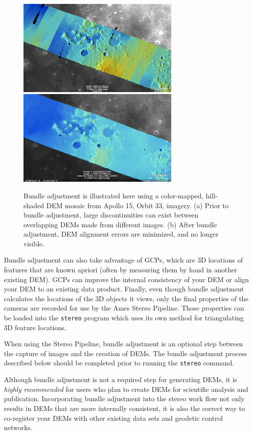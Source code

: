 \begin{figure}[bt]
  \centering
  \includegraphics[width=8cm]{images/ba_orig}
  \includegraphics[width=8cm]{images/ba_adjusted}
  \caption{Bundle adjustment is illustrated here using a color-mapped,
    hill-shaded DEM mosaic from Apollo 15, Orbit 33, imagery. (a)
    Prior to bundle adjustment, large discontinuities can exist between
    overlapping DEMs made from different images. (b) After bundle
    adjustment, DEM alignment errors are minimized, and no longer visible.}
  \label{fig:bundle_adjustment}
\end{figure}

Bundle adjustment can also take advantage of \acp{GCP}, which are
3D locations of features that are known apriori (often by measuring
them by hand in another existing \ac{DEM}). \acp{GCP} can improve the internal
consistency of your \ac{DEM} or align your \ac{DEM} to an existing data
product. Finally, even though bundle adjustment calculates the
locations of the 3D objects it views, only the final properties of
the cameras are recorded for use by the Ames Stereo Pipeline. Those
properties can be loaded into the \texttt{stereo} program which
uses its own method for triangulating 3D feature locations.

When using the Stereo Pipeline, bundle adjustment is an optional step
between the capture of images and the creation of \acp{DEM}. The bundle
adjustment process described below should be completed prior to
running the \texttt{stereo} command.

Although bundle adjustment is not a required step for generating
\acp{DEM}, it is {\em highly recommended} for users who plan to
create \acp{DEM} for scientific analysis and publication.  Incorporating
bundle adjustment into the stereo work flow not only results in
\acp{DEM} that are more internally consistent, it is also the correct
way to co-register your \acp{DEM} with other existing data sets and
geodetic control networks.

